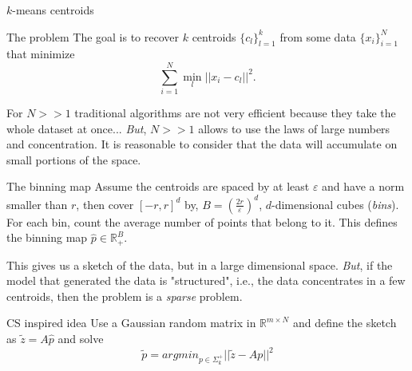 
\begin{frame}{$k$-means centroids}
	\begin{block}{The problem}
		The goal is to recover $k$ centroids $\{c_l\}_{l=1}^k$ from some data $\{x_i\}_{i=1}^N$ that minimize
		\begin{equation*}
			\sum_{i=1}^N \min_l ||x_i - c_l||^2.
		\end{equation*}
	\end{block}
	For $N>>1$ traditional algorithms are not very efficient because they take the whole dataset at once...
	\newline
	\emph{But}, $N>>1$ allows to use the laws of large numbers and concentration. It is reasonable to consider that the data will accumulate on small portions of the space.

\end{frame}

\begin{frame}
	\begin{block}{The binning map}
		Assume the centroids are spaced by at least $\varepsilon$ and have a norm smaller than $r$, then cover $[-r,r]^d$ by, $B=(\frac{2r}{\varepsilon})^d$, $d$-dimensional cubes (\emph{bins}). For each bin, count the average number of points that belong to it. This defines the binning map $\hat{p}\in\mathbb{R}^B_+$.
	\end{block}
	This gives us a sketch of the data, but in a large dimensional space.\newline
	\emph{But}, if the model that generated the data is "structured", i.e., the data concentrates in a few centroids, then the problem is a \emph{sparse} problem.
	\begin{block}{CS inspired idea}
		Use a Gaussian random matrix in $\mathbb{R}^{m\times N}$ and define the sketch as $\tilde z = A\hat{p}$ and solve
		\begin{equation*}
			\tilde p = argmin_{p\in\Sigma_k^+}||\tilde z - Ap||^2 
		\end{equation*}
	\end{block}
\end{frame}

